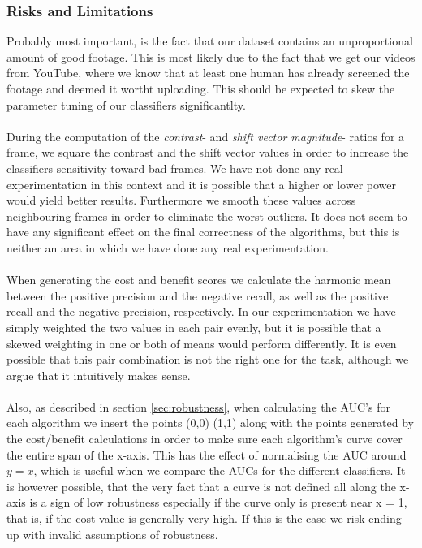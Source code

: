 \subsubsection{Risks and Limitations}
%
Probably most important, is the fact that our dataset contains an unproportional amount of good footage. This is most likely due to the fact that we get our videos from YouTube, where we know that at least one human has already screened the footage and deemed it wortht uploading. This should be expected to skew the parameter tuning of our classifiers significantlty.\\
\\
During the computation of the \textit{contrast}- and \textit{shift vector magnitude}- ratios for a frame, we square the contrast and the shift vector values in order to increase the classifiers sensitivity toward bad frames. We have not done any real experimentation in this context and it is possible that a higher or lower power would yield better results. Furthermore we smooth these values across neighbouring frames in order to eliminate the worst outliers. It does not seem to have any significant effect on the final correctness of the algorithms, but this is neither an area in which we have done any real experimentation.\\
\\
When generating the cost and benefit scores we calculate the harmonic mean between the positive precision and the negative recall, as well as the positive recall and the negative precision, respectively. In our experimentation we have simply weighted the two values in each pair evenly, but it is possible that a skewed weighting in one or both of means would perform differently. It is even possible that this pair combination is not the right one for the task, although we argue that it intuitively makes sense.\\
\\
Also, as described in section \ref{sec:robustness}, when calculating the AUC's for each algorithm we insert the points (0,0) (1,1) along with the points generated by the cost/benefit calculations in order to make sure each algorithm's curve cover the entire span of the x-axis. This has the effect of normalising the AUC around $y = x$, which is useful when we compare the AUCs for the different classifiers. It is however possible, that the very fact that a curve is not defined all along the x-axis is a sign of low robustness especially if the curve only is present near x = 1, that is, if the cost value is generally very high. If this is the case we risk ending up with invalid assumptions of robustness.\\
